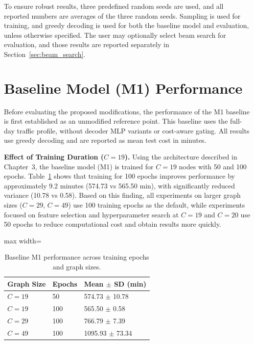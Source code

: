 To ensure robust results, three predefined random seeds are used, and all reported numbers are
averages of the three random seeds. Sampling is used for training, and greedy decoding is used
for both the baseline model and evaluation, unless otherwise specified. The user may optionally
select beam search for evaluation, and those results are reported separately in
Section~\ref{sec:beam_search}.

\section{Baseline Model (M1) Performance}
\label{sec:baseline_performance}

Before evaluating the proposed modifications, the performance of the M1 baseline is first
established as an unmodified reference point. This baseline uses the full-day traffic profile,
without decoder MLP variants or cost-aware gating. All results use greedy decoding and are
reported as mean test cost in minutes.

\textbf{Effect of Training Duration ($C = 19$).} Using the architecture described in Chapter~3, the baseline model (M1) is trained for
$C = 19$ nodes with 50 and 100 epochs. Table~\ref{tab:baseline_combined} shows that training
for 100 epochs improves performance by approximately 9.2 minutes (574.73 vs 565.50 min),
with significantly reduced variance (10.78 vs 0.58). Based on this finding, all experiments
on larger graph sizes ($C = 29$, $C = 49$) use 100 training epochs as the default, while
experiments focused on feature selection and hyperparameter search at $C = 19$ and
$C = 20$ use 50 epochs to reduce computational cost and obtain results more quickly.

\begin{table}[H]
\centering
\caption{Baseline M1 performance across training epochs and graph sizes.}
\label{tab:baseline_combined}
\begin{adjustbox}{max width=\textwidth}
\begin{tabular}{lll}
\toprule
\textbf{Graph Size} & \textbf{Epochs} & \textbf{Mean $\pm$ SD (min)} \\
\midrule
$C = 19$ & 50  & 574.73 $\pm$ 10.78 \\
$C = 19$ & 100 & 565.50 $\pm$ 0.58 \\
$C = 29$ & 100 & 766.79 $\pm$ 7.39 \\
$C = 49$ & 100 & 1095.93 $\pm$ 73.34 \\
\bottomrule
\end{tabular}
\end{adjustbox}
\end{table}

